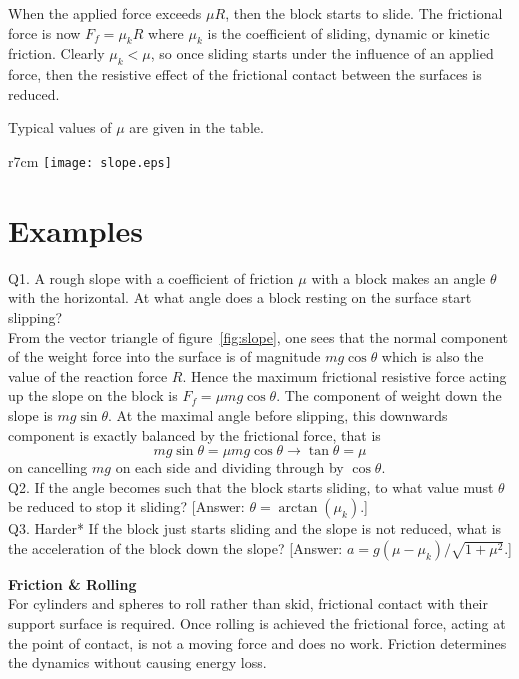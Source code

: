 \documentclass[a4paper,11pt]{article}
\begin{document}
When the applied force exceeds $\mu R$, then the block starts to slide.  The frictional force is now $F_f = \mu_k R$ where $\mu_k$ is the coefficient of sliding, dynamic or kinetic friction.  Clearly $\mu_k < \mu$, so once sliding starts under the influence of an applied force, then the resistive effect of the frictional contact between the surfaces is reduced.

Typical values of $\mu$ are given in the table.\\
\begin{wrapfigure}{r}{7cm}\vspace{-1cm}
\center
\texttt{[image: slope.eps]}
\caption{A rough slope inclined at angle $\theta$ to the horizontal with a block of mass $m$ resting on it.  The vector triangle resolves the weight force parallel and perpendicular to the slope.}
\label{fig:slope}
\end{wrapfigure}

\section{Examples}
\vspace{-.3cm}
  Q1.   A rough slope with a coefficient of friction $\mu$ with a block makes an angle $\theta$ with the horizontal.  At what angle does a block resting on the surface start slipping?\\

From the vector triangle of figure~\ref{fig:slope}, one sees that the normal component of the weight force into the surface is of magnitude $mg\cos\theta$ which is also the value of the reaction force $R$.  Hence the maximum frictional resistive force acting up the slope on the block is $F_f = \mu mg \cos\theta$.  The component of weight down the slope is $mg\sin\theta$.  At the maximal angle before slipping, this downwards component is exactly balanced by the frictional force, that is
\begin{equation*} mg\sin\theta = \mu mg \cos\theta \rightarrow \tan\theta = \mu
\end{equation*}
on cancelling  $mg$ on each side and dividing through by $\cos\theta$.\\
  Q2.  If the angle becomes such that the block starts sliding, to what value must $\theta$ be reduced to stop it sliding?  [Answer: $\theta = \arctan(\mu_k)$.]\\
  Q3. Harder* If the block just starts sliding and the slope is not reduced, what is the acceleration of the block down the slope? [Answer: $a = g(\mu -\mu_k)/\sqrt{1 + \mu^2}$.]\\
  \vspace{.4cm}
  
  \noindent
{\large \textbf{Friction \& Rolling}}\\
For cylinders and spheres to roll rather than skid, frictional contact with their support surface is required.  Once rolling is achieved the frictional force, acting at the point of contact, is not a moving force and does no work.  Friction determines the dynamics without causing energy loss.
\end{document}
